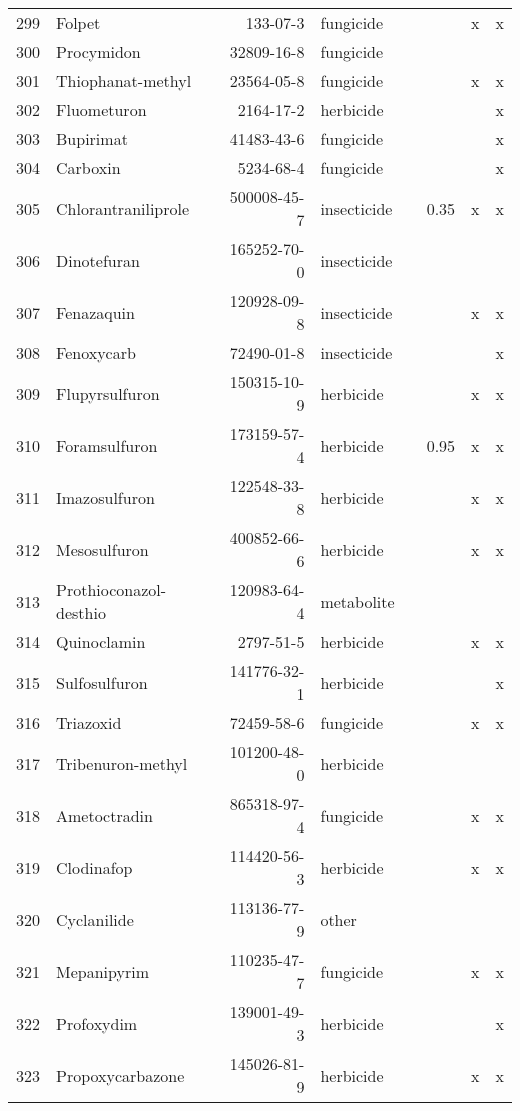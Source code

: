 \begin{longtable}{lp{4cm}rlp{1cm}p{1.5cm}p{1.5cm}p{1cm}}
  299 & Folpet & 133-07-3 & fungicide &  &  & x & x \\ 
  300 & Procymidon & 32809-16-8 & fungicide &  &  &  &  \\ 
  301 & Thiophanat-methyl & 23564-05-8 & fungicide &  &  & x & x \\ 
  302 & Fluometuron & 2164-17-2 & herbicide &  &  &  & x \\ 
  303 & Bupirimat & 41483-43-6 & fungicide &  &  &  & x \\ 
  304 & Carboxin & 5234-68-4 & fungicide &  &  &  & x \\ 
  305 & Chlorantraniliprole & 500008-45-7 & insecticide &  & 0.35 & x & x \\ 
  306 & Dinotefuran & 165252-70-0 & insecticide &  &  &  &  \\ 
  307 & Fenazaquin & 120928-09-8 & insecticide &  &  & x & x \\ 
  308 & Fenoxycarb & 72490-01-8 & insecticide &  &  &  & x \\ 
  309 & Flupyrsulfuron & 150315-10-9 & herbicide &  &  & x & x \\ 
  310 & Foramsulfuron & 173159-57-4 & herbicide &  & 0.95 & x & x \\ 
  311 & Imazosulfuron & 122548-33-8 & herbicide &  &  & x & x \\ 
  312 & Mesosulfuron & 400852-66-6 & herbicide &  &  & x & x \\ 
  313 & Prothioconazol-desthio & 120983-64-4 & metabolite &  &  &  &  \\ 
  314 & Quinoclamin & 2797-51-5 & herbicide &  &  & x & x \\ 
  315 & Sulfosulfuron & 141776-32-1 & herbicide &  &  &  & x \\ 
  316 & Triazoxid & 72459-58-6 & fungicide &  &  & x & x \\ 
  317 & Tribenuron-methyl & 101200-48-0 & herbicide &  &  &  &  \\ 
  318 & Ametoctradin & 865318-97-4 & fungicide &  &  & x & x \\ 
  319 & Clodinafop & 114420-56-3 & herbicide &  &  & x & x \\ 
  320 & Cyclanilide & 113136-77-9 & other &  &  &  &  \\ 
  321 & Mepanipyrim & 110235-47-7 & fungicide &  &  & x & x \\ 
  322 & Profoxydim & 139001-49-3 & herbicide &  &  &  & x \\ 
  323 & Propoxycarbazone & 145026-81-9 & herbicide &  &  & x & x \\ 

\end{longtable}
